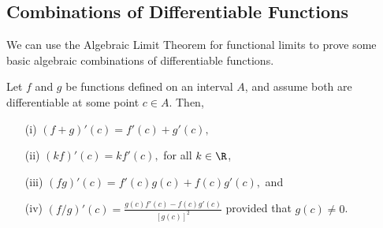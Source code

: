 \subsection{Combinations of Differentiable Functions}

We can use the Algebraic Limit Theorem for functional limits to prove some basic algebraic combinations of differentiable functions.

\begin{tcolorbox}
    \begin{thm}
    Let \( f  \) and \( g  \) be functions defined on an interval \( A  \), and assume both are differentiable at some point \( c \in A \). Then, 
    \begin{enumerate}
        \item[(i)] \( (f+g)'(c) = f'(c) + g'(c), \)
        \item[(ii)] \( (kf)'(c) = kf'(c), \) for all \( k \in \R  \),
        \item[(iii)] \( (fg)'(c) = f'(c)g(c) + f(c)g'(c),  \) and 
        \item[(iv)] \( (f/g)'(c) = \frac{ g(c)f'(c) - f(c)g'(c)  }{ [g(c)]^2 }  \) provided that \( g(c) \neq  0 \).
    \end{enumerate}
    \end{thm}
\end{tcolorbox}

